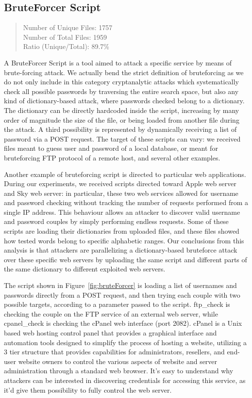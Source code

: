\subsection{BruteForcer Script}

\begin{quote}
Number of Unique Files: 1757\\
Number of Total Files: 1959\\
Ratio (Unique/Total): 89.7\%
\end{quote}

A BruteForcer Script is a tool aimed to attack a specific service by means of brute-forcing attack. We actually bend the strict definition of bruteforcing as we do not only include in this category cryptanalytic attacks which systematically check all possible passwords by traversing the entire search space, but also any kind of dictionary-based attack, where passwords checked belong to a dictionary. The dictionary can be directly hardcoded inside the script, increasing by many order of magnitude the size of the file, or being loaded from another file during the attack. A third possibility is represented by dynamically receiving a list of password via a POST request. The target of these scripts can vary: we received files meant to guess user and password of a local database, or meant for bruteforcing FTP protocol of a remote host, and several other examples.

Another example of bruteforcing script is directed to particular web applications. During our experiments, we received scripts directed toward Apple web server and Sky web server: in particular, these two web services allowed for username and password checking without tracking the number of requests performed from a single IP address. This behaviour allows an attacker to discover valid username and password couples by simply performing endless requests. Some of these scripts are loading their dictionaries from uploaded files, and these files showed how tested words belong to specific alphabetic ranges. Our conclusions from this analysis is that attackers are parallelizing a dictionary-based bruteforce attack over these specific web servers by uploading the same script and different parts of the same dictionary to different exploited web servers.

The script shown in Figure~\ref{fig:bruteForcer} is loading a list of usernames and passwords directly from a POST request, and then trying each couple with two possible targets, according to a parameter passed to the script. ftp\_check is checking the couple on the FTP service of an external web server, while cpanel\_check is checking the cPanel web interface (port 2082). cPanel is a Unix based web hosting control panel that provides a graphical interface and automation tools designed to simplify the process of hosting a website, utilizing a 3 tier structure that provides capabilities for administrators, resellers, and end-user website owners to control the various aspects of website and server administration through a standard web browser. It's easy to understand why attackers can be interested in discovering credentials for accessing this service, as it'd give them possibility to fully control the web server.

